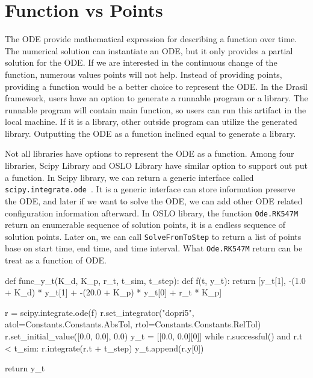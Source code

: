 \section{Function vs Points}
The ODE provide mathematical expression for describing a function over time. The numerical solution can instantiate an ODE, but it only provides a partial solution for the ODE. If we are interested in the continuous change of the function, numerous values points will not help. Instead of providing points, providing a function would be a better choice to represent the ODE. In the Drasil framework, users have an option to generate a runnable program or a library. The runnable program will contain main function, so users can run this artifact in the local machine. If it is a library, other outside program can utilize the generated library. Outputting the ODE as a function inclined equal to generate a library.

Not all libraries have options to represent the ODE as a function. Among four libraries, Scipy Library and OSLO Library have similar option to support out put a function. In Scipy library, we can return a generic interface called \verb|scipy.integrate.ode|~\citep{scipyfun}. It is a generic interface can store information preserve the ODE, and later if we want to solve the ODE, we can add other ODE related configuration information afterward. In OSLO library, the function \verb|Ode.RK547M| return an enumerable sequence of solution points, it is a endless sequence of solution points. Later on, we can call \verb|SolveFromToStep| to return a list of points base on start time, end time, and time interval. What \verb|Ode.RK547M| return can be treat as a function of ODE.

\begin{listing}[ht]
\begin{python1}
def func_y_t(K_d, K_p, r_t, t_sim, t_step):
    def f(t, y_t):
        return [y_t[1], -(1.0 + K_d) * y_t[1] + -(20.0 + K_p) * y_t[0] + r_t * K_p]
    
    r = scipy.integrate.ode(f)
    r.set_integrator("dopri5", atol=Constants.Constants.AbsTol, rtol=Constants.Constants.RelTol)
    r.set_initial_value([0.0, 0.0], 0.0)
    y_t = [[0.0, 0.0][0]]
    while r.successful() and r.t < t_sim:
        r.integrate(r.t + t_step)
        y_t.append(r.y[0])
    
    return y_t
\end{python1}
\label{code_pythonscipy}
\end{listing}

